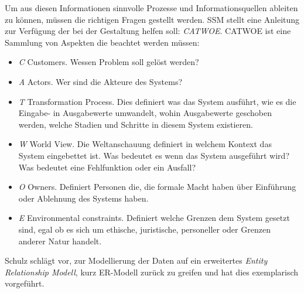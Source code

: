 Um aus diesen Informationen sinnvolle Prozesse und Informationsquellen ableiten zu können, müssen die richtigen Fragen gestellt werden. SSM stellt eine Anleitung zur Verfügung der bei der Gestaltung helfen soll: \textit{CATWOE}. CATWOE ist eine Sammlung von Aspekten die beachtet werden müssen:
\begin{itemize}
	\item \textit{C} Customers. Wessen Problem soll gelöst werden?
	\item \textit{A} Actors. Wer sind die Akteure des Systems?
	\item \textit{T} Transformation Process. Dies definiert was das System ausführt, wie es die Eingabe- in Ausgabewerte umwandelt, wohin Ausgabewerte geschoben werden, welche Stadien und Schritte in diesem System existieren.
	\item \textit{W} World View. Die Weltanschauung definiert in welchem Kontext das System eingebettet ist. Was bedeutet es wenn das System ausgeführt wird? Was bedeutet eine Fehlfunktion oder ein Ausfall?
	\item \textit{O} Owners. Definiert Personen die, die formale Macht haben über Einführung oder Ablehnung des Systems haben.
	\item \textit{E} Environmental constraints. Definiert welche Grenzen dem System gesetzt sind, egal ob es sich um ethische, juristische, personeller oder Grenzen anderer Natur handelt.
\end{itemize}

Schulz schlägt vor, zur Modellierung der Daten auf ein erweitertes \textit{Entity Relationship Modell}, kurz ER-Modell zurück zu greifen und hat dies exemplarisch vorgeführt. 



